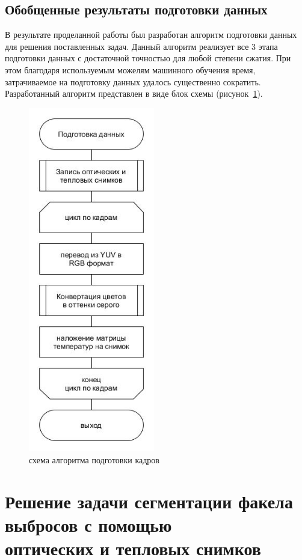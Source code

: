 \documentclass[14pt, a4paper]{extreport}
\begin{document}
\subsection[Обобщенные результаты подготовки данных]{Обобщенные результаты подготовки данных}
	В результате проделанной работы был разработан алгоритм подготовки данных для решения поставленных задач. Данный алгоритм реализует все 3 этапа подготовки данных с достаточной точностью для любой степени сжатия. При этом благодаря используемым можелям машинного обучения время, затрачиваемое на подготовку данных удалось существенно сократить. Разработанный алгоритм представлен в виде блок схемы (рисунок~\ref{fig:fullprepare}).
	\begin{figure}[h!]
		\centering
		\includegraphics[width = 5.5cm]{image/chapter_2/fullprepare}	
		\caption{схема алгоритма подготовки кадров}
		\label{fig:fullprepare}
	\end{figure}
\section[\vspace*{-0.22cm}Решение задачи сегментации факела выбросов с помощью \\ \hspace*{-0.75cm}оптических и тепловых снимков]{Решение задачи сегментации факела выбросов с помощью \\ оптических и тепловых снимков}
\end{document}
